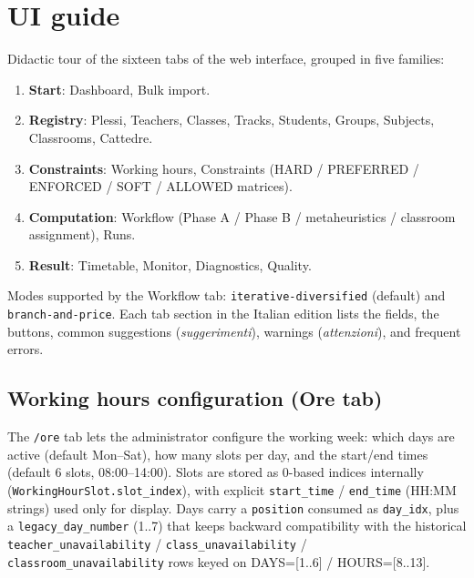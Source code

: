 \chapter{UI guide}
\label{ch:guida_ui_en}


Didactic tour of the sixteen tabs of the web interface, grouped
in five families:

\begin{enumerate}
  \item \textbf{Start}: Dashboard, Bulk import.
  \item \textbf{Registry}: Plessi, Teachers, Classes, Tracks,
    Students, Groups, Subjects, Classrooms, Cattedre.
  \item \textbf{Constraints}: Working hours, Constraints (HARD /
    PREFERRED / ENFORCED / SOFT / ALLOWED matrices).
  \item \textbf{Computation}: Workflow (Phase A / Phase B /
    metaheuristics / classroom assignment), Runs.
  \item \textbf{Result}: Timetable, Monitor, Diagnostics, Quality.
\end{enumerate}

Modes supported by the Workflow tab: \texttt{iterative-diversified}
(default) and \texttt{branch-and-price}. Each tab section in the
Italian edition lists the fields, the buttons, common
suggestions (\emph{suggerimenti}), warnings (\emph{attenzioni}),
and frequent errors.




\section*{Working hours configuration (Ore tab)}

The \texttt{/ore} tab lets the administrator configure the
working week: which days are active (default Mon--Sat), how
many slots per day, and the start/end times (default 6 slots,
08:00--14:00). Slots are stored as 0-based indices internally
(\texttt{WorkingHourSlot.slot\_index}), with explicit
\texttt{start\_time} / \texttt{end\_time} (HH:MM strings) used
only for display. Days carry a \texttt{position} consumed as
\texttt{day\_idx}, plus a \texttt{legacy\_day\_number} (1..7)
that keeps backward compatibility with the historical
\texttt{teacher\_unavailability} / \texttt{class\_unavailability}
/ \texttt{classroom\_unavailability} rows keyed on DAYS=[1..6] /
HOURS=[8..13].

